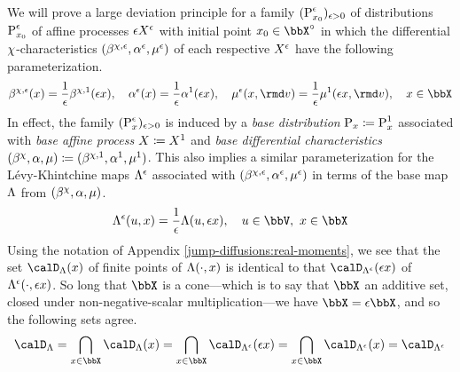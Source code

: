 We will prove a large deviation principle for a family $({\operatorname{P}}^\epsilon_{x_0})_{\epsilon>0}$ of distributions ${\operatorname{P}}^\epsilon_{x_0}$ of affine processes $\epsilon X^\epsilon$ with initial point $\stateVar_0 \in \stateSpace^\circ$ in which the differential $\chi$-characteristics $(\beta^{\chi,\epsilon}, \alpha^\epsilon, \mu^\epsilon)$ of each respective $X^\epsilon$ have the following parameterization.
\begin{equation}
  \label{eq:characteristic-asymptotics}
  \affDrift^{\trunc,\epsilon}(\stateVar) = \frac1\epsilon \affDrift^{\trunc,1}(\epsilon\stateVar), \quad
  \affDiff^\epsilon(\stateVar) = \frac1\epsilon \affDiff^1(\epsilon\stateVar), \quad
  \affJump^\epsilon(\stateVar, \rmd\markVar) = \frac1\epsilon \affJump^1(\epsilon\stateVar, \rmd\markVar), \quad \stateVar \in \stateSpace
\end{equation}
In effect, the family $({\operatorname{P}}^\epsilon_x)_{\epsilon>0}$ is induced by a \emph{base distribution} ${\operatorname{P}}_x \coloneqq {\operatorname{P}}^1_x$ associated with \emph{base affine process} $X \coloneqq X^1$ and \emph{base differential characteristics} $(\beta^\chi, \alpha, \mu) \coloneqq (\beta^{\chi,1}, \alpha^1, \mu^1)$.
This also implies a similar parameterization for the L\'evy-Khintchine maps $\Lambda^\epsilon$ associated with $(\beta^{\chi,\epsilon}, \alpha^\epsilon, \mu^\epsilon)$ in terms of the base map $\Lambda$ from $(\beta^\chi, \alpha, \mu)$.
\begin{equation}
  \label{eq:LK-asymptotics}
  \ode^\epsilon(\momentVar, \stateVar) = \frac1\epsilon \ode(\momentVar, \epsilon \stateVar), \quad \momentVar \in \vecSpace, ~ \stateVar \in \stateSpace
\end{equation}
Using the notation of Appendix \ref{jump-diffusions:real-moments}, we see that the set $\odeSpace(\stateVar)$ of finite points of $\Lambda(\cdot, x)$ is identical to that $\odeSpacee(\epsilon\stateVar)$ of $\Lambda^\epsilon(\cdot, \epsilon x)$.
So long that $\stateSpace$ is a cone---which is to say that $\stateSpace$ an additive set, closed under non-negative-scalar multiplication---we have $\stateSpace = \epsilon\stateSpace$, and so the following sets agree.
\begin{equation*}
  \odeSpace = \bigcap_{\stateVar \in \stateSpace} \odeSpace(\stateVar) = \bigcap_{\stateVar \in \stateSpace} \odeSpacee(\epsilon\stateVar) = \bigcap_{\stateVar \in \stateSpace} \odeSpacee(\stateVar) = \odeSpacee
\end{equation*}

